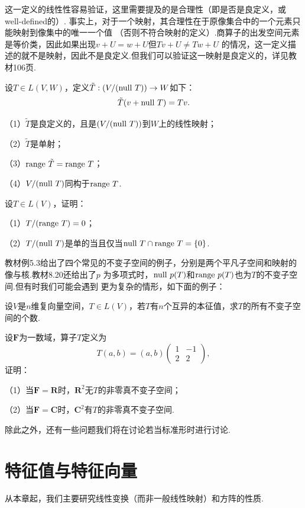这一定义的线性性容易验证，这里需要提及的是合理性（即是否是良定义，或well-defined的）.
事实上，对于一个映射，其合理性在于原像集合中的一个元素只能映射到像集中的唯一一个值
（否则不符合映射的定义）.商算子的出发空间元素是等价类，因此如果出现$v+U=w+U$但$Tv+U\neq Tw+U$
的情况，这一定义描述的就不是映射，因此不是良定义.但我们可以验证这一映射是良定义的，详见教材106页.
\begin{example}
	设$T\in L(V,W)$，定义$\tilde{T}:(V/(\textup{null }T))\to W$如下：
	$$\tilde{T}(v+\textup{null }T)=Tv.$$

	\textup{（1）}$\tilde{T}$是良定义的，且是$(V/(\textup{null }T))$到$W$上的线性映射；

	\textup{（2）}$\tilde{T}$是单射；

	\textup{（3）}$\textup{range }\tilde{T}=\textup{range }T$；

	\textup{（4）}$V/(\textup{null }T)$同构于$\textup{range }T$.
\end{example}
\begin{example}
	设$T\in L(V)$，证明：

	\textup{（1）}$T/(\textup{range }T)=0$；

	\textup{（2）}$T/(\textup{null }T)$是单的当且仅当$\textup{null }T\cap\textup{range }T=\{0\}$.
\end{example}
教材例5.3给出了四个常见的不变子空间的例子，分别是两个平凡子空间和映射的像与核.教材8.20还给出了$p$
为多项式时，$\textup{null }p(T)$和$\textup{range }p(T)$也为$T$的不变子空间.但有时我们可能会遇到
更为复杂的情形，如下面的例子：
\begin{example}
	设$V$是$n$维复向量空间，$T\in L(V)$，若$T$有$n$个互异的本征值，求$T$的所有不变子空间的个数.
\end{example}
\begin{example}
	设$\mathbf{F}$为一数域，算子$T$定义为
	$$T(a,b)=(a,b)\begin{pmatrix}
		1 & -1 \\ 2 & 2
	\end{pmatrix},$$证明：

	\textup{（1）}当$\mathbf{F}=\mathbf{R}$时，$\mathbf{R}^2$无$T$的非零真不变子空间；

	\textup{（2）}当$\mathbf{F}=\mathbf{C}$时，$\mathbf{C}^2$有$T$的非零真不变子空间.
\end{example}
除此之外，还有一些问题我们将在讨论若当标准形时进行讨论.

\section{特征值与特征向量}
从本章起，我们主要研究线性变换（而非一般线性映射）和方阵的性质.
